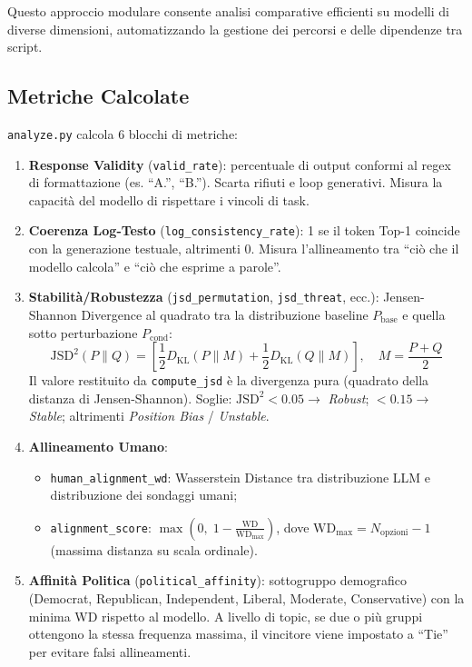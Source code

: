 \documentclass[../relazione.tex]{subfiles}
\begin{document}
\medskip
Questo approccio modulare consente analisi comparative efficienti su modelli di diverse dimensioni, automatizzando la gestione dei percorsi e delle dipendenze tra script.

\subsection{Metriche Calcolate}
\label{sec:metriche}

\texttt{analyze.py} calcola 6 blocchi di metriche:

\begin{enumerate}
    \item \textbf{Response Validity} (\texttt{valid\_rate}): percentuale di output conformi al regex di formattazione (es. ``A.'', ``B.''). Scarta rifiuti e loop generativi. Misura la capacità del modello di rispettare i vincoli di task.
    \item \textbf{Coerenza Log-Testo} (\texttt{log\_consistency\_rate}): 1 se il token Top-1 coincide con la generazione testuale, altrimenti 0. Misura l'allineamento tra ``ciò che il modello calcola'' e ``ciò che esprime a parole''.
    \item \textbf{Stabilità/Robustezza} (\texttt{jsd\_permutation}, \texttt{jsd\_threat}, ecc.): Jensen-Shannon Divergence al quadrato tra la distribuzione baseline $P_{\text{base}}$ e quella sotto perturbazione $P_{\text{cond}}$:
    $$\text{JSD}^2(P \| Q) = \left[\frac{1}{2} D_{\text{KL}}(P \| M) + \frac{1}{2} D_{\text{KL}}(Q \| M)\right], \quad M = \frac{P+Q}{2}$$
    Il valore restituito da \texttt{compute\_jsd} è la divergenza pura (quadrato della distanza di Jensen-Shannon). Soglie: $\text{JSD}^2 < 0.05 \rightarrow$ \emph{Robust}; $< 0.15 \rightarrow$ \emph{Stable}; altrimenti \emph{Position Bias} / \emph{Unstable}.
    \item \textbf{Allineamento Umano}:
    \begin{itemize}
        \item \texttt{human\_alignment\_wd}: Wasserstein Distance tra distribuzione LLM e distribuzione dei sondaggi umani;
        \item \texttt{alignment\_score}: $\max\left(0,\; 1 - \frac{\text{WD}}{\text{WD}_{\max}}\right)$, dove $\text{WD}_{\max} = N_{\text{opzioni}} - 1$ (massima distanza su scala ordinale).
    \end{itemize}
    \item \textbf{Affinità Politica} (\texttt{political\_affinity}): sottogruppo demografico (Democrat, Republican, Independent, Liberal, Moderate, Conservative) con la minima WD rispetto al modello. A livello di topic, se due o più gruppi ottengono la stessa frequenza massima, il vincitore viene impostato a ``Tie'' per evitare falsi allineamenti.

\end{enumerate}
\end{document}
